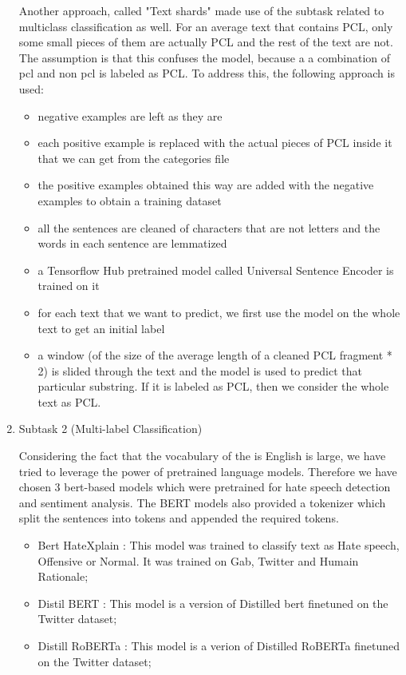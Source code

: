 \documentclass[11pt]{article}
\begin{document}
\begin{enumerate}
Another approach, called "Text shards" made use of the subtask related to
multiclass classification as well. For an average text that contains PCL,
only some small pieces of them are actually PCL and the rest of the text are
not. The assumption is that this confuses the model, because a a combination
of pcl and non pcl is labeled as PCL. To address this, the following
approach is used:

\begin{itemize}
    \item negative examples are left as they are

    \item each positive example is replaced with the actual pieces of PCL inside
    it that we can get from the categories file

    \item the positive examples obtained this way are added with the negative
    examples to obtain a training dataset

    \item all the sentences are cleaned of characters that are not letters and
    the words in each sentence are lemmatized

    \item a Tensorflow Hub pretrained model called Universal Sentence Encoder is
    trained on it

    \item for each text that we want to predict, we first use the model on the
    whole text to get an initial label

    \item a window (of the size of the average length of a cleaned PCL fragment
    * 2) is slided through the text and the model is used to predict that
    particular substring. If it is labeled as PCL, then we consider the whole
    text as PCL.
\end{itemize}

\item Subtask 2 (Multi-label Classification)

Considering the fact that the vocabulary of the is English is large, we have tried
to leverage the power of pretrained language models. Therefore we have chosen 3
bert-based models which were pretrained for hate speech detection and sentiment analysis.
The BERT models also provided a tokenizer which split the sentences into tokens and appended the required tokens.

\begin{itemize}
    \item Bert HateXplain \cite{mathew2020hatexplain}: This model was trained to classify text as Hate speech, Offensive or Normal.
        It was trained on Gab, Twitter and Humain Rationale;
    \item Distil BERT \cite{?}: This model is a version of Distilled bert finetuned on the Twitter dataset;
    \item Distill RoBERTa \cite{?}: This model is a verion of Distilled RoBERTa finetuned on the Twitter dataset;
\end{itemize}



\end{enumerate}
\end{document}

